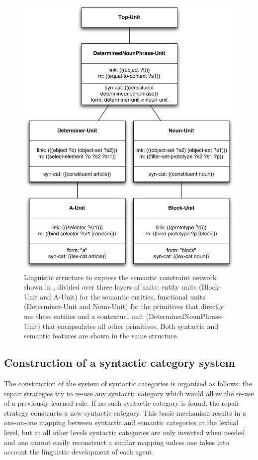 \begin{figure}[htbp]
  \begin{center}
    \includegraphics[width=.8\textwidth]{./composition/figures/learning-2.pdf}
    \caption[Second linguistic structure to express semantic
    constraint networks]{Linguistic structure to express the semantic
      constraint network shown in ,
      divided over three layers of units: entity units (Block-Unit and
      A-Unit) for the semantic entities, functional units
      (Determiner-Unit and Noun-Unit) for the primitives that directly
      use these entities and a contextual unit
      (DeterminedNounPhrase-Unit) that encapsulates all other
      primitives. Both syntactic and semantic features are shown in
      the same structure.}
    \label{f:map-structure-2}
  \end{center}
\end{figure}

\subsection{Construction of a syntactic category system}
\label{s:construction-syntactic-category-system}

The construction of the system of syntactic categories is organized as
follows: the repair strategies try to re-use any syntactic category
which would allow the re-use of a previously learned rule. If no such
syntactic category is found, the repair strategy constructs a new
syntactic category. This basic mechanism results in a one-on-one
mapping between syntactic and semantic categories at the lexical
level, but at all other levels syntactic categories are only invented
when needed and one cannot easily reconstruct a similar mapping unless
one takes into account the linguistic development of each agent.

